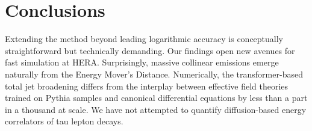 \section{Conclusions}\label{sec:conclusions}

Extending the method beyond leading logarithmic accuracy is conceptually
straightforward but technically demanding. Our findings open new avenues
for fast simulation at HERA. Surprisingly, massive collinear emissions
emerge naturally from the Energy Mover's Distance. Numerically, the
transformer-based total jet broadening differs from the interplay
between effective field theories trained on Pythia samples and canonical
differential equations by less than a part in a thousand at scale. We
have not attempted to quantify diffusion-based energy correlators of tau
lepton decays.

